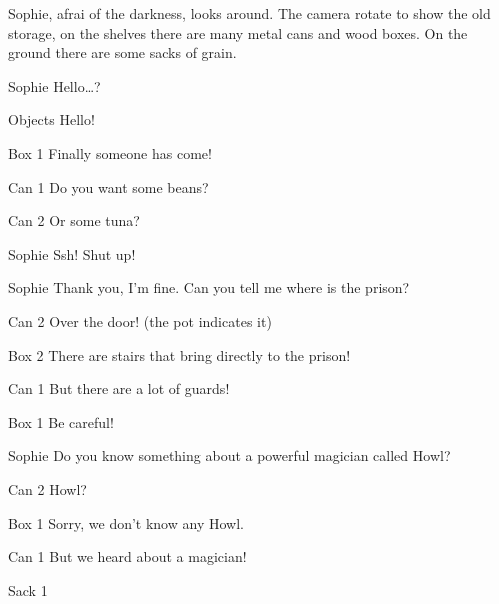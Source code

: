 \begin{screenplay}

Sophie, afrai of the darkness, looks around. The camera rotate to show the old storage, on the shelves there are many metal cans and wood boxes. On the ground there are some sacks of grain.

\begin{dialogue}{Sophie}
Hello…?
\end{dialogue}
\begin{dialogue}[cheerful]{Objects}
 Hello!
\end{dialogue}
\begin{dialogue}{Box 1}
 Finally someone has come!
\end{dialogue}
\begin{dialogue}{Can 1}
 Do you want some beans?
\end{dialogue}
\begin{dialogue}{Can 2}
Or some tuna?
\end{dialogue}
\begin{dialogue}[worried]{Sophie}
Ssh! Shut up!
\end{dialogue}
\begin{dialogue}{Sophie}
Thank you, I’m fine. Can you tell me where is the prison?
\end{dialogue}
\begin{dialogue}{Can 2}
Over the door! (the pot indicates it)
\end{dialogue}
\begin{dialogue}{Box 2}
There are stairs that bring directly to the prison!
\end{dialogue}
\begin{dialogue}{Can 1}
But there are a lot of guards!
\end{dialogue}
\begin{dialogue}{Box 1}
Be careful!
\end{dialogue}
\begin{dialogue}{Sophie}
Do you know something about a powerful magician called Howl?
\end{dialogue}
\begin{dialogue}{Can 2}
Howl?
\end{dialogue}
\begin{dialogue}{Box 1}
Sorry, we don’t know any Howl.
\end{dialogue}
\begin{dialogue}{Can 1}
But we heard about a magician!
\end{dialogue}
\begin{dialogue}{Sack 1}

\end{dialogue}
\end{screenplay}
